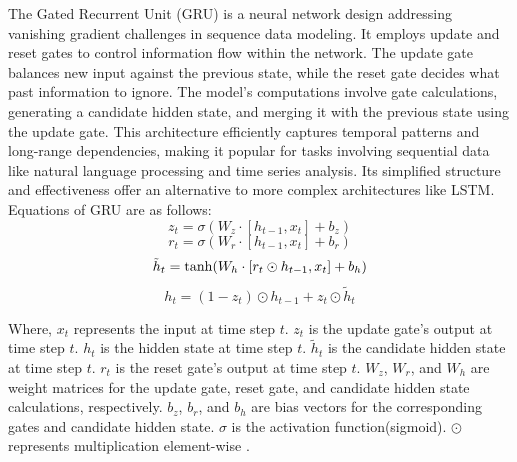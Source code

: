 \documentclass[sn-mathphys,Numbered]{sn-jnl}
\theoremstyle{thmstyleone}
\theoremstyle{thmstyletwo}
\theoremstyle{thmstylethree}
\begin{document}
The Gated Recurrent Unit (GRU) is a neural network design addressing vanishing gradient challenges in sequence data modeling. It employs update and reset gates to control information flow within the network. The update gate balances new input against the previous state, while the reset gate decides what past information to ignore. The model's computations involve gate calculations, generating a candidate hidden state, and merging it with the previous state using the update gate. This architecture efficiently captures temporal patterns and long-range dependencies, making it popular for tasks involving sequential data like natural language processing and time series analysis. Its simplified structure and effectiveness offer an alternative to more complex architectures like LSTM. Equations of GRU are as follows:
\begin{equation}
z_t = \sigma(W_z \cdot [h_{t-1}, x_t]  +  b_z) 
\end{equation}
\begin{equation}
r_t = \sigma(W_r \cdot [h_{t-1}, x_t] +   b_r) 
\end{equation}
\begin{equation}
\tilde{h}_t = \tanh(W_h \cdot [r_t \odot h_{t-1}, x_t]  +  b_h) \\
\end{equation}
\begin{equation}
h_t = (1 - z_t) \odot h_{t-1} + z_t \odot \tilde{h}_t
\end{equation}



Where, \(x_t\) represents the input at time step \(t\).
 \(z_t\) is the update gate's output at time step \(t\).
 \(h_t\) is the hidden state at time step \(t\).
 \(\tilde{h}_t\) is the candidate hidden state at time step \(t\).
 \(r_t\) is the reset gate's output at time step \(t\).
 \(W_z\), \(W_r\), and \(W_h\) are weight matrices for the update gate, reset gate, and candidate hidden state calculations, respectively.
 \(b_z\), \(b_r\), and \(b_h\) are bias vectors for the corresponding gates and candidate hidden state.
 \(\sigma\) is the activation function(sigmoid).
 \(\odot\) represents multiplication element-wise .
\end{document}
